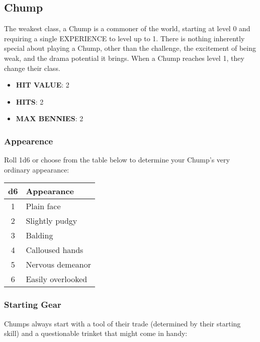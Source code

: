 \newpage
\subsection{Chump}
The weakest class, a Chump is a commoner of the world, starting at level 0 and requiring a single EXPERIENCE to level up to 1. There is nothing inherently special about playing a Chump, other than the challenge, the excitement of being weak, and the drama potential it brings. When a Chump reaches level 1, they change their class.

\begin{multicols}{2}
\begin{itemize}
  \item \textbf{HIT VALUE}: 2
  \item \textbf{HITS}: 2
  \item \textbf{MAX BENNIES}: 2
\end{itemize}

\subsubsection*{Appearence}
Roll 1d6 or choose from the table below to determine your Chump's very ordinary appearance:

\begin{adjustbox}{width=0.45\columnwidth,center}
\begin{tabular}{|c|l|}
\hline
\textbf{d6} & \textbf{Appearance} \\
\hline
1 & Plain face \\
2 & Slightly pudgy \\
3 & Balding \\
4 & Calloused hands \\
5 & Nervous demeanor \\
6 & Easily overlooked \\
\hline
\end{tabular}
\end{adjustbox}

\subsubsection*{Starting Gear}
Chumps always start with a tool of their trade (determined by their starting skill) and a questionable trinket that might come in handy:


\end{multicols}
